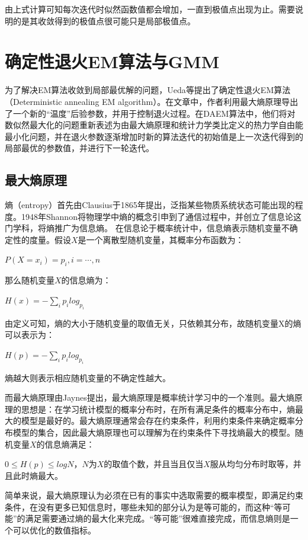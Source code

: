 \documentclass[a4paper,12pt,openany,oneside,utf-8]{ctexbook}
\begin{document}
    由上式计算可知每次迭代时似然函数值都会增加，一直到极值点出现为止。需要说明的是其收敛得到的极值点很可能只是局部极值点。
    
    \section{确定性退火EM算法与GMM}
    为了解决EM算法收敛到局部最优解的问题，Ueda\cite{ref25}等提出了确定性退火EM算法（Deterministic annealing EM algorithm）。在文章中，作者利用最大熵原理导出了一个新的“温度”后验参数，并用于控制退火过程。在DAEM算法中，他们将对数似然最大化的问题重新表述为由最大熵原理和统计力学类比定义的热力学自由能最小化问题，并在退火参数逐渐增加时新的算法迭代的初始值是上一次迭代得到的局部最优的参数值，并进行下一轮迭代。
    \subsection{最大熵原理}
	熵（entropy）首先由Clausius于1865年提出，泛指某些物质系统状态可能出现的程度。1948年Shannon将物理学中熵的概念引申到了通信过程中，并创立了信息论这门学科，将熵推广为信息熵。
	在信息论于概率统计中，信息熵表示随机变量不确定性的度量。假设$X$是一个离散型随机变量，其概率分布函数为：
    \begin{center}
        $P(X=x_i)=p_i,i=\cdots,n$
    \end{center}
    那么随机变量$X$的信息熵为：
    \begin{center}
    $H(x)=-\sum_i p_i log_{p_i}$
    \end{center}
    
    由定义可知，熵的大小于随机变量的取值无关，只依赖其分布，故随机变量X的熵可以表示为：
    \begin{center}
    $H(p)= -\sum_i p_i log_{p_i}$
    \end{center}
    
    熵越大则表示相应随机变量的不确定性越大。

    而最大熵原理由Jaynes\cite{ref26}提出，最大熵原理是概率统计学习中的一个准则。最大熵原理的思想是：在学习统计模型的概率分布时，在所有满足条件的概率分布中，熵最大的模型是最好的。最大熵原理通常会存在约束条件，利用约束条件来确定概率分布模型的集合，因此最大熵原理也可以理解为在约束条件下寻找熵最大的模型。随机变量$X$的信息熵满足：
    
    $0\leq{H(p)}\leq{logN}$，$N$为$X$的取值个数，并且当且仅当$X$服从均匀分布时取等，并且此时熵最大。
    
	简单来说，最大熵原理认为必须在已有的事实中选取需要的概率模型，即满足约束条件，在没有更多已知信息时，哪些未知的部分认为是等可能的，而这种“等可能”的满足需要通过熵的最大化来完成。“等可能”很难直接完成，而信息熵则是一个可以优化的数值指标。
	
\end{document}
